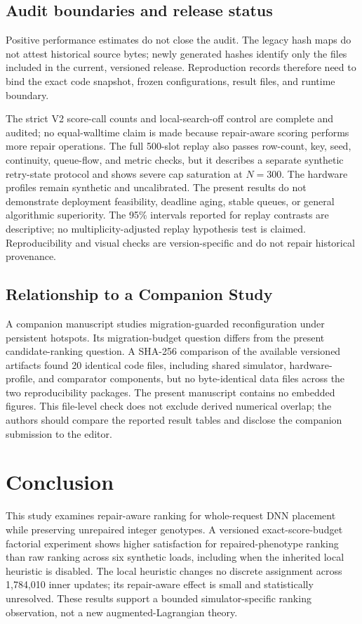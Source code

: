 \documentclass[pdflatex,sn-mathphys-num]{sn-jnl}
\begin{document}
\subsection{Audit boundaries and release status}
Positive performance estimates do not close the audit. The legacy hash maps do not attest historical source bytes; newly generated hashes identify only the files included in the current, versioned release. Reproduction records therefore need to bind the exact code snapshot, frozen configurations, result files, and runtime boundary.

The strict V2 score-call counts and local-search-off control are complete and audited; no equal-walltime claim is made because repair-aware scoring performs more repair operations. The full 500-slot replay also passes row-count, key, seed, continuity, queue-flow, and metric checks, but it describes a separate synthetic retry-state protocol and shows severe cap saturation at $N=300$. The hardware profiles remain synthetic and uncalibrated. The present results do not demonstrate deployment feasibility, deadline aging, stable queues, or general algorithmic superiority. The 95\% intervals reported for replay contrasts are descriptive; no multiplicity-adjusted replay hypothesis test is claimed. Reproducibility and visual checks are version-specific and do not repair historical provenance.

\subsection{Relationship to a Companion Study}
A companion manuscript studies migration-guarded reconfiguration under persistent hotspots. Its migration-budget question differs from the present candidate-ranking question. A SHA-256 comparison of the available versioned artifacts found 20 identical code files, including shared simulator, hardware-profile, and comparator components, but no byte-identical data files across the two reproducibility packages. The present manuscript contains no embedded figures. This file-level check does not exclude derived numerical overlap; the authors should compare the reported result tables and disclose the companion submission to the editor.



\section{Conclusion}
This study examines repair-aware ranking for whole-request DNN placement while preserving unrepaired integer genotypes. A versioned exact-score-budget factorial experiment shows higher satisfaction for repaired-phenotype ranking than raw ranking across six synthetic loads, including when the inherited local heuristic is disabled. The local heuristic changes no discrete assignment across 1,784,010 inner updates; its repair-aware effect is small and statistically unresolved. These results support a bounded simulator-specific ranking observation, not a new augmented-Lagrangian theory.
\end{document}
